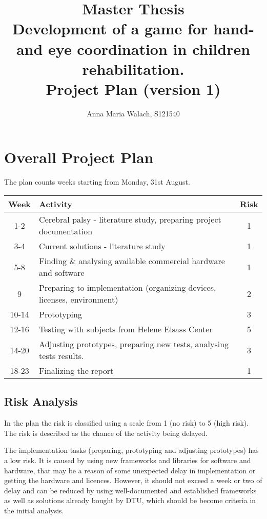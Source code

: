 \documentclass[10pt,a4paper]{article}
\title{{Master Thesis\\[0.5em]}
       {\bf \huge Development of a game for hand- and eye coordination in children rehabilitation.\\[0.5em]}
       {\bf Project Plan (version 1)}}
\author{Anna Maria Walach, S121540}
\begin{document}
\maketitle

\section{Overall Project Plan}

The plan counts weeks starting from Monday, 31st August.

\begin{tabular}{c|l|c}
  Week  & Activity                                            						& Risk
  \\
  \hline
  1-2   & Cerebral palsy - literature study, preparing project documentation     	& 1 \\
  3-4	& Current solutions - literature study	   									& 1 \\
  5-8	& Finding \& analysing available commercial hardware and software 			& 1 \\
   9    & Preparing to implementation (organizing devices, licenses, environment)   & 2 \\
  10-14	& Prototyping       														& 3 \\
  12-16 & Testing with subjects from Helene Elsass Center							& 5 \\
  14-20 & Adjusting prototypes, preparing new tests, analysing tests results.   	& 3 \\
  18-23 & Finalizing the report     												& 1 \\
  \hline
\end{tabular}
  
\subsection{Risk Analysis}

In the plan the risk is classified using a scale from 1 (no risk) to 5
(high risk). The risk is described as the chance of the activity being
delayed.

The implementation tasks (preparing, prototyping and adjusting prototypes) has a low risk. It is caused by using new frameworks and libraries for software and hardware, that may be a reason of some unexpected delay in implementation or getting the hardware and licences. However, it should not exceed a week or two of delay and can be reduced by using well-documented and established frameworks as well as solutions already bought by DTU, which should be become criteria in the initial analysis.
\end{document}
